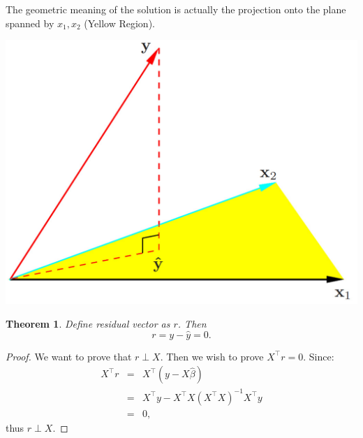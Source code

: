 \documentclass{article}
\theoremstyle{MyNonumberplain}
\theoremstyle{break}
\newtheorem*{proof}{Proof. }
\newcommand{\T}{^\intercal}
\theoremstyle{break}
\newtheorem{theorem}{Theorem}[section]
\begin{document}
The geometric meaning of the solution is actually the projection onto the plane spanned by $x_1,x_2$ (Yellow Region). 
\begin{center}
    \includegraphics[scale=0.1]{Images/img9.png}
\end{center}

\begin{thmbox}
    \begin{theorem}
        Define residual vector as $r$. Then
        $$r=y-\hat{y}=0.$$
    \end{theorem}
    \begin{prfbox}
        \begin{proof}
            We want to prove that $r\perp X$. Then we wish to prove $X\T r=0$.
            Since:
            \begin{eqnarray*}
                X\T r &=& X\T (y-X\hat{\beta}) \\
                &=& X\T y - X\T X (X\T X)^{-1} X\T y\\
                &=& 0,
            \end{eqnarray*}
            thus $r\perp X$.
        \end{proof}
    \end{prfbox}
\end{thmbox} 
\end{document}
